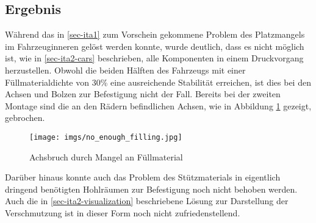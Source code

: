 \documentclass[.../Dokumentation.tex]{subfiles}
\begin{document}
\subsection{Ergebnis}\label{sec-ita2-result}
Während das in \ref{sec-ita1} zum Vorschein gekommene Problem des 
Platzmangels im Fahrzeuginneren gelöst werden konnte, wurde deutlich, 
dass es nicht möglich ist, wie in \ref{sec-ita2-cars} beschrieben, 
alle Komponenten in einem Druckvorgang herzustellen. 
Obwohl die beiden Hälften des Fahrzeugs mit einer Füllmaterialdichte von 
30\% eine ausreichende Stabilität erreichen, ist dies bei den Achsen und 
Bolzen zur Befestigung nicht der Fall. Bereits bei der zweiten Montage sind 
die an den Rädern befindlichen Achsen, wie in Abbildung 
\ref{fig-not-enough-filling} gezeigt, gebrochen. 
\begin{figure}[H]
\begin{center}
    \texttt{[image: imgs/no\_enough\_filling.jpg]}
    \caption{Achsbruch durch Mangel an Füllmaterial}
    \label{fig-not-enough-filling}
\end{center}
\end{figure}
\noindent
Darüber hinaus konnte auch das Problem des Stützmaterials in eigentlich 
dringend benötigten Hohlräumen zur Befestigung noch nicht behoben werden.
Auch die in \ref{sec-ita2-visualization} beschriebene Lösung zur 
Darstellung der Verschmutzung ist in dieser Form noch nicht zufriedenstellend.
\end{document}
